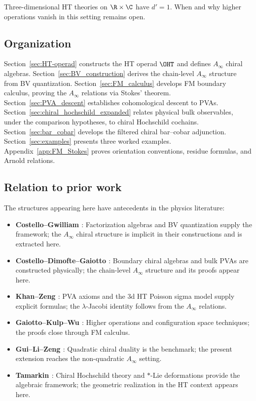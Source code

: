 Three-dimensional HT theories on $\R \times \C$ have $d'=1$. When and why higher operations vanish in this setting remains open.

\subsection{Organization}

Section~\ref{sec:HT-operad} constructs the HT operad $\OHT$ and defines $A_\infty$ chiral algebras.
Section~\ref{sec:BV_construction} derives the chain-level $A_\infty$ structure from BV quantization.
Section~\ref{sec:FM_calculus} develops FM boundary calculus, proving the $A_\infty$ relations via Stokes' theorem.
Section~\ref{sec:PVA_descent} establishes cohomological descent to PVAs.
Section~\ref{sec:chiral_hochschild_expanded} relates physical bulk
observables, under the comparison hypotheses, to chiral Hochschild
cochains.
Section~\ref{sec:bar_cobar} develops the filtered chiral bar--cobar adjunction.
Section~\ref{sec:examples} presents three worked examples.
Appendix~\ref{app:FM_Stokes} proves orientation conventions, residue formulas, and Arnold relations.

\subsection{Relation to prior work}

The structures appearing here have antecedents in the physics literature:

\begin{itemize}
\item \textbf{Costello--Gwilliam \cite{CG17}}: Factorization algebras and BV quantization supply the framework; the $A_\infty$ chiral structure is implicit in their constructions and is extracted here.

\item \textbf{Costello--Dimofte--Gaiotto \cite{CDG20}}: Boundary chiral algebras and bulk PVAs are constructed physically; the chain-level $A_\infty$ structure and its proofs appear here.

\item \textbf{Khan--Zeng \cite{KZ25}}: PVA axioms and the 3d HT Poisson sigma model supply explicit formulas; the $\lambda$-Jacobi identity follows from the $A_\infty$ relations.

\item \textbf{Gaiotto--Kulp--Wu \cite{GKW25}}: Higher operations and configuration space techniques; the proofs close through FM calculus.

\item \textbf{Gui--Li--Zeng \cite{GLZ22}}: Quadratic chiral duality is the benchmark; the present extension reaches the non-quadratic $A_\infty$ setting.

\item \textbf{Tamarkin \cite{Tam02}}: Chiral Hochschild theory and $*$-Lie deformations provide the algebraic framework; the geometric realization in the HT context appears here.
\end{itemize}

